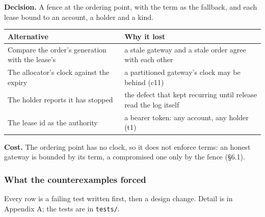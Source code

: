 \documentclass[10pt,a4paper]{article}
\newcounter{none}  %
\begin{document}
\textbf{Decision.} A fence at the ordering point, with the term as the fallback, and
each lease bound to an account, a holder and a kind.

{\def\LTcaptype{none} %
\begin{longtable}[]{@{}
  >{\raggedright\arraybackslash}p{}
  >{\raggedright\arraybackslash}p{}@{}}
\toprule\noalign{}
\begin{minipage}[b]{\linewidth}\raggedright
Alternative
\end{minipage} & \begin{minipage}[b]{\linewidth}\raggedright
Why it lost
\end{minipage} \\
\midrule\noalign{}
\endhead
\bottomrule\noalign{}
\endlastfoot
Compare the order's generation with the lease's & a stale gateway and a stale order agree with each other \\
The allocator's clock against the expiry & a partitioned gateway's clock may be behind (c11) \\
The holder reports it has stopped & the defect that kept recurring until release read the log itself \\
The lease id as the authority & a bearer token: any account, any holder (t1) \\
\end{longtable}
}

\textbf{Cost.} The ordering point has no clock, so it does not enforce terms: an
honest gateway is bounded by its term, a compromised one only by the fence
(§6.1).

\subsubsection{What the counterexamples forced}\label{what-the-counterexamples-forced}

Every row is a failing test written first, then a design change. Detail is in
Appendix A; the tests are in \texttt{tests/}.
\end{document}

